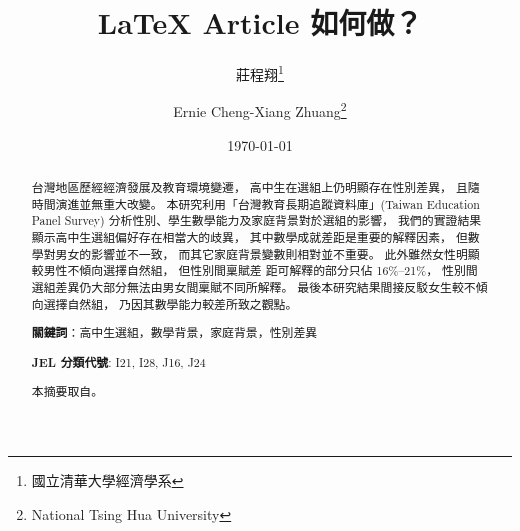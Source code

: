 \documentclass[utf8,12pt]{article} %
\title{\LaTeX{}  Article 如何做？}
\author{莊程翔\thanks{國立清華大學經濟學系} \and Ernie Cheng-Xiang Zhuang\thanks{National Tsing Hua University}}
\date{\today}
\begin{document}

%
\maketitle 
%
%
\begin{abstract}\fontsize{12}{20pt}
\begin{spacing}{1.5}
台灣地區歷經經濟發展及教育環境變遷，
高中生在選組上仍明顯存在性別差異，
且隨時間演進並無重大改變。
本研究利用「台灣教育長期追蹤資料庫」(Taiwan Education Panel Survey) 分析性別、學生數學能力及家庭背景對於選組的影響，
我們的實證結果顯示高中生選組偏好存在相當大的歧異，
其中數學成就差距是重要的解釋因素，
但數學對男女的影響並不一致，
而其它家庭背景變數則相對並不重要。
此外雖然女性明顯較男性不傾向選擇自然組，
但性別間稟賦差 距可解釋的部分只佔 16\%–21\%，
性別間選組差異仍大部分無法由男女間稟賦不同所解釋。
最後本研究結果間接反駁女生較不傾向選擇自然組，
乃因其數學能力較差所致之觀點。

\bigskip
\noindent
\textbf{關鍵詞}：高中生選組，數學背景，家庭背景，性別差異

\bigskip
\noindent
\textbf{JEL 分類代號}: I21, I28, J16, J24

\bigskip
\noindent
本摘要取自\href{https://econ.ntu.edu.tw/ter/new/data/new/TER394/TER394-4.pdf}{\citet{郭祐誠2011}}。
\end{spacing}
\end{abstract}
%
%
\newpage
\fontsize{12}{20pt}
\begin{spacing}{1.5}
\tableofcontents
%
\newpage
\listoffigures
%
\newpage
\listoftables
%
\end{spacing}
%
%
\newpage
{} %
\end{document}
